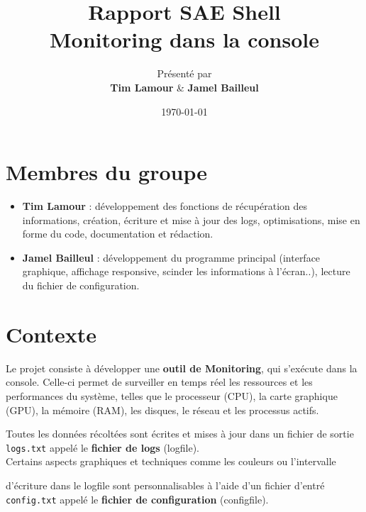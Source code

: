 \documentclass{article}
\title{\Huge \textbf{Rapport SAE Shell} \\[0.5cm] \Large Monitoring dans la console}
\author{\large Présenté par\\ \textbf{Tim Lamour} \& \textbf{Jamel Bailleul}}
\date{\today}
\begin{document}
\maketitle %
\tableofcontents %
\newpage

\section{Membres du groupe}
\begin{itemize}
    \item \textbf{Tim Lamour} : développement des fonctions de récupération des informations, création, écriture et mise à jour des logs, optimisations, mise en forme du code, documentation et rédaction.
    \item \textbf{Jamel Bailleul} : développement du programme principal (interface graphique, affichage responsive, scinder les informations à l'écran..), lecture du fichier de configuration.

\end{itemize}

\section{Contexte}
Le projet consiste à développer une \textbf{outil de Monitoring}, qui s'exécute dans la console.
Celle-ci permet de surveiller en temps réel les ressources et les performances du système, telles que le processeur (CPU), la carte graphique (GPU), la mémoire (RAM), les disques, le réseau et les processus actifs.
\vspace{1em}

Toutes les données récoltées sont écrites et mises à jour dans un fichier de sortie \texttt{logs.txt} appelé le \textbf{fichier de logs} (logfile).
\\
Certains aspects graphiques et techniques comme les couleurs ou l'intervalle 
  
d'écriture dans le logfile sont personnalisables à l'aide d'un fichier d'entré \texttt{config.txt} appelé le \textbf{fichier de configuration} (configfile).

\end{document}
